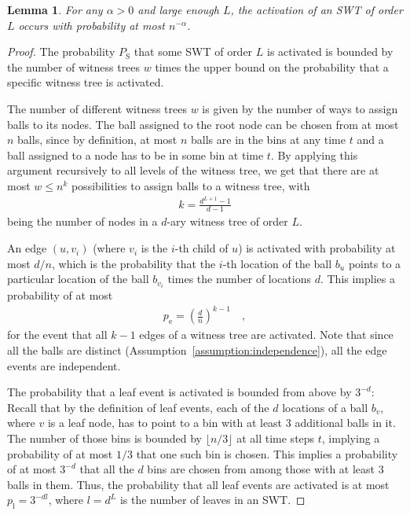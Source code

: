 \documentclass[a4paper,12pt]{article}
\newtheorem{lemma}{Lemma}
\begin{document}
\begin{lemma}\label{lemma:swt:activation}
For any $\alpha>0$ and large enough $L$, the activation of an SWT of order $L$ occurs with probability at most $n^{-\alpha}$.
\end{lemma}
\begin{proof}
The probability $P_\mathrm{S}$ that some SWT of order $L$ is activated is bounded by the number of witness trees $w$ times the upper bound on the probability that a specific witness tree is activated.

The number of different witness trees $w$ is given by the number of ways to assign balls to its nodes. The ball assigned to the root node can be chosen from at most $n$ balls, since by definition, at most $n$ balls are in the bins at any time $t$ and a ball assigned to a node has to be in some bin at time $t$. By applying this argument recursively to all levels of the witness tree, we get that there are at most $w \leq n^k$ possibilities to assign balls to a witness tree, with 
\begin{align*}
k = \frac{d^{L+1}-1}{d-1}
\end{align*}
being the number of nodes in a $d$-ary witness tree of order $L$.
 
An edge $(u, v_i)$ (where $v_i$ is the $i$-th child of $u$) is activated with probability at most $d/n$, which is the probability that the $i$-th location of the ball $b_u$ points to a particular location of the ball $b_{v_i}$ times the number of locations $d$. This implies a probability of at most
\begin{align*}
p_\mathrm{e} = \left(\frac{d}{n}\right)^{k-1} \quad ,
\end{align*} 
for the event that all $k-1$ edges of a witness tree are activated. Note that since all the balls are distinct (Assumption~\ref{assumption:independence}), all the edge events are independent.

The probability that a leaf event is activated is bounded from above by $3^{-d}$: Recall that by the definition of leaf events, each of the $d$ locations of a ball $b_v$, where $v$ is a leaf node, has to point to a bin with at least 3 additional balls in it. The number of those bins is bounded by $\lfloor n/3 \rfloor$ at all time steps $t$, implying a probability of at most $1/3$ that one such bin is chosen. This implies a probability of at most $3^{-d}$ that all the $d$ bins are chosen from among those with at least 3 balls in them. Thus, the probability that all leaf events are activated is at most $p_\mathrm{l} = 3^{-d l}$, where $l = d^{L}$ is the number of leaves in an SWT.


\end{proof}
\end{document}
